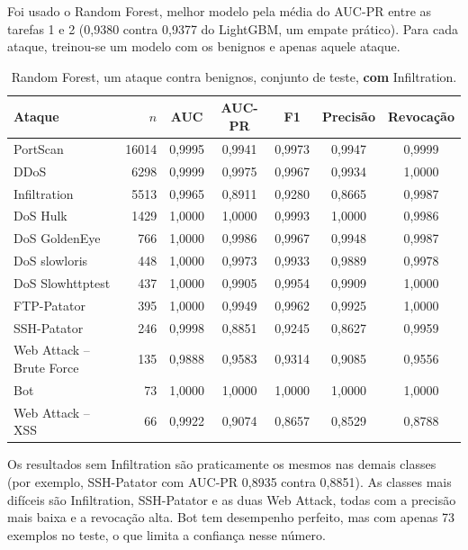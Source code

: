 Foi usado o Random Forest, melhor modelo pela média do AUC-PR entre as tarefas 1 e 2 (0,9380 contra 0,9377 do LightGBM, um empate prático). Para cada ataque, treinou-se um modelo com os benignos e apenas aquele ataque.

\begin{table}[ht]
\centering
\caption{Random Forest, um ataque contra benignos, conjunto de teste, \textbf{com} Infiltration.}
\begin{tabular}{lrccccc}
\toprule
Ataque & $n$ & AUC & AUC-PR & F1 & Precisão & Revocação \\
\midrule
PortScan                 & 16014 & 0,9995 & 0,9941 & 0,9973 & 0,9947 & 0,9999 \\
DDoS                     &  6298 & 0,9999 & 0,9975 & 0,9967 & 0,9934 & 1,0000 \\
Infiltration             &  5513 & 0,9965 & 0,8911 & 0,9280 & 0,8665 & 0,9987 \\
DoS Hulk                 &  1429 & 1,0000 & 1,0000 & 0,9993 & 1,0000 & 0,9986 \\
DoS GoldenEye            &   766 & 1,0000 & 0,9986 & 0,9967 & 0,9948 & 0,9987 \\
DoS slowloris            &   448 & 1,0000 & 0,9973 & 0,9933 & 0,9889 & 0,9978 \\
DoS Slowhttptest         &   437 & 1,0000 & 0,9905 & 0,9954 & 0,9909 & 1,0000 \\
FTP-Patator              &   395 & 1,0000 & 0,9949 & 0,9962 & 0,9925 & 1,0000 \\
SSH-Patator              &   246 & 0,9998 & 0,8851 & 0,9245 & 0,8627 & 0,9959 \\
Web Attack -- Brute Force &   135 & 0,9888 & 0,9583 & 0,9314 & 0,9085 & 0,9556 \\
Bot                      &    73 & 1,0000 & 1,0000 & 1,0000 & 1,0000 & 1,0000 \\
Web Attack -- XSS        &    66 & 0,9922 & 0,9074 & 0,8657 & 0,8529 & 0,8788 \\
\bottomrule
\end{tabular}
\end{table}

Os resultados sem Infiltration são praticamente os mesmos nas demais classes (por exemplo, SSH-Patator com AUC-PR 0,8935 contra 0,8851). As classes mais difíceis são Infiltration, SSH-Patator e as duas Web Attack, todas com a precisão mais baixa e a revocação alta. Bot tem desempenho perfeito, mas com apenas 73 exemplos no teste, o que limita a confiança nesse número.

